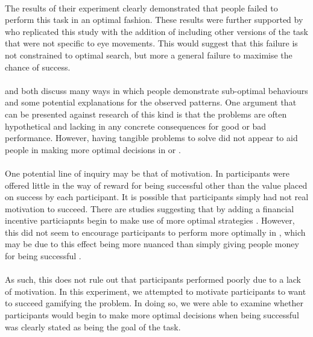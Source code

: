 \documentclass[12pt]{article}
\begin{document}
\paragraph{} The results of their experiment clearly demonstrated that people failed to perform this task in an optimal fashion. These results were further supported by \cite{clarke2015failure} who replicated this study with the addition of including other versions of the task that were not specific to eye movements. This would suggest that this failure is not constrained to optimal search, but more a general failure to maximise the chance of success. 

\paragraph{} \cite{KahnemanChoicesValuseFrames} and \cite{Gigerenzer2011} both discuss many ways in which people demonstrate sub-optimal behaviours and some potential explanations for the observed patterns. One argument that can be presented against research of this kind is that the problems are often hypothetical and lacking in any concrete consequences for good or bad performance. However, having tangible problems to solve did not appear to aid people in making more optimal decisions in \cite{clarke2015failure} or \cite{morvan2012human}. 

\paragraph{} One potential line of inquiry may be that of motivation. In \cite{clarke2015failure} participants were offered little in the way of reward for being successful other than the value placed on success by each participant. It is possible that participants simply had not real motivation to succeed. There are studies suggesting that by adding a financial incentive particiapnts begin to make use of more optimal strategies \citep{Goodnow1955,phillips1966conservatism}. However, this did not seem to encourage participants to perform more optimally in \cite{morvan2012human}, which may be due to this effect being more nuanced than simply giving people money for being successful \citep{Camerer1999}. 

\paragraph{} As such, this does not rule out that participants performed poorly due to a lack of motivation. In this experiment, we attempted to motivate participants to want to succeed gamifying the problem. In doing so, we were able to examine whether participants would begin to make more optimal decisions when being successful was clearly stated as being the goal of the task. 
\end{document}

